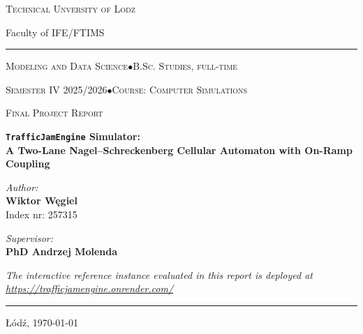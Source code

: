 \documentclass[11pt,a4paper]{article}
\newcommand{\reportUniversity}{Technical Unversity of Lodz}
\newcommand{\reportFaculty}{Faculty of IFE/FTIMS}
\newcommand{\reportProgramme}{Modeling and Data Science}
\newcommand{\reportLevel}{B.Sc. Studies, full-time}
\newcommand{\reportSemester}{Semester IV 2025/2026}
\newcommand{\reportCourse}{Computer Simulations}
\newcommand{\reportTitle}{\texttt{TrafficJamEngine} Simulator:\\[4pt]
A Two-Lane Nagel--Schreckenberg Cellular Automaton with On-Ramp Coupling}
\newcommand{\reportSubtitle}{Final Project Report}
\newcommand{\reportAuthor}{Wiktor Węgiel}
\newcommand{\reportIndex}{Index nr: 257315}
\newcommand{\reportSupervisor}{PhD Andrzej Molenda}
\newcommand{\reportLocation}{Łódź}
\newcommand{\reportDate}{\today}
\begin{document}
\begin{titlepage}
\centering
\thispagestyle{empty}

{\large\scshape \reportUniversity \par}
\vspace{2pt}
{\normalsize \reportFaculty \par}

\vspace{0.6cm}
\rule{\textwidth}{0.8pt}

\vspace{0.4cm}
{\small \textsc{\reportProgramme \quad$\bullet$\quad \reportLevel} \par}
{\small \textsc{\reportSemester \quad$\bullet$\quad Course: \reportCourse} \par}

\vspace{2.5cm}

{\large\textsc{\reportSubtitle}\par}

\vspace{0.8cm}

{\Large\bfseries \reportTitle \par}

\vspace{2.0cm}

\begin{minipage}{0.46\textwidth}
\raggedright
\textit{\small Author:}\\[2pt]
{\large\bfseries \reportAuthor}\\[2pt]
{\small \reportIndex}
\end{minipage}\hfill
\begin{minipage}{0.46\textwidth}
\raggedleft
\textit{\small Supervisor:}\\[2pt]
{\large\bfseries \reportSupervisor}
\end{minipage}

\vfill

{\small\itshape The interactive reference instance evaluated in this
report is deployed at\\
\url{https://trafficjamengine.onrender.com/}}

\vspace{0.6cm}
\rule{\textwidth}{0.6pt}
\vspace{0.2cm}

{\normalsize \reportLocation, \reportDate \par}

\end{titlepage}
\end{document}
